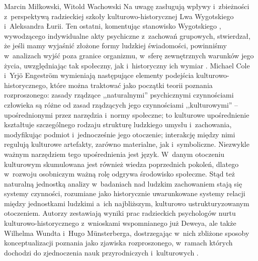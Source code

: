 \begin{artplenv2auth}{Marcin Miłkowski, Witold Wachowski}
Na uwagę zasługują wpływy i~zbieżności z~perspektywą radzieckiej szkoły kulturowo-historycznej Lwa Wygotskiego i~Aleksandra Łurii. Ten ostatni, komentując stanowisko Wygotskiego
\parencites[np.][]{vygotskij_wybrane_1971}[warto także porównać z:][]{mead_umysl_1975}, %
 wywodzącego indywidualne akty psychiczne z~zachowań grupowych, stwierdzał, że jeśli mamy wyjaśnić złożone formy ludzkiej świadomości, powinniśmy w~analizach wyjść poza granice organizmu, w~sferę zewnętrznych warunków jego życia, uwzględniając tak społeczny, jak i~historyczny ich wymiar 
\parencite[][]{luria_azyk_1979}. %
 Michael Cole i~Yrjö Engeström wymieniają następujące elementy podejścia kulturowo-historycznego, które można traktować jako początki teorii poznania rozproszonego: zasady rządzące ,,naturalnymi'' psychicznymi czynnościami człowieka są różne od zasad rządzących jego czynnościami ,,kulturowymi'' -- upośrednionymi przez narzędzia i~normy społeczne; to kulturowe upośrednienie kształtuje szczególnego rodzaju strukturę ludzkiego umysłu i~zachowania, modyfikując podmiot i~jednocześnie jego otoczenie; interakcję między nimi regulują kulturowe artefakty, zarówno materialne, jak i~symboliczne. Niezwykle ważnym narzędziem tego upośrednienia jest język. W~danym otoczeniu kulturowym skumulowana jest również wiedza poprzednich pokoleń, dlatego w~rozwoju osobniczym ważną rolę odgrywa środowisko społeczne. Stąd też naturalną jednostką analizy w~badaniach nad ludzkim zachowaniem stają się systemy czynności, rozumiane jako historycznie uwarunkowane systemy relacji między jednostkami ludzkimi a~ich najbliższym, kulturowo ustrukturyzowanym otoczeniem. Autorzy zestawiają wyniki prac radzieckich psychologów nurtu kulturowo-historycznego z~wnioskami wspomnianego już Deweya, ale także Wilhelma Wundta i~Hugo Münsterberga, dostrzegając w~nich zbliżone sposoby konceptualizacji poznania jako zjawiska rozproszonego, w~ramach których dochodzi do zjednoczenia nauk przyrodniczych i~kulturowych 
\parencite[][]{cole_cultural-historical_1993}.%



\end{artplenv2auth}
